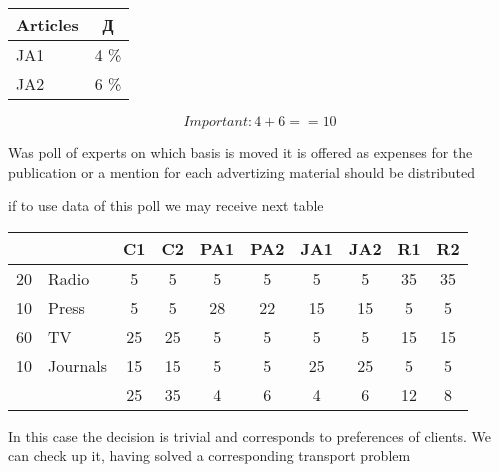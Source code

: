 \documentclass[a4paper,11pt]{scrartcl}
\begin{document}
\begin{tabular}{|l |c|}
\hline
 Articles & Д  \\

\hline
JA1  & 4  \%\\
\hline
JA2  & 6  \%\\
\hline

\end {tabular}
\begin{equation} Important:  4+6 == 10 \end{equation}

\bigskip

Was poll of experts on which basis is moved it is offered as expenses for the publication or a mention for each advertizing material should be distributed

if to use  data of this poll we may receive  next   table

\bigskip

\begin{tabular}{|l|l |c| c| c| c| c| c| c| c|}
\hline
&      &  C1 & C2  &  PA1 & PA2 & JA1 & JA2 & R1 & R2\\
\hline
20&Radio &  5 & 5  &  5 & 5 & 5 & 5 & 35 & 35\\
\hline
10&Press &  5 & 5  &  28 & 22 &  15 & 15 & 5 & 5\\
\hline
60&TV &  25 & 25  &  5 & 5 & 5 & 5 & 15 & 15\\
\hline
10&Journals &  15 & 15  &  5 & 5 & 25 & 25 & 5 & 5\\
\hline
 & & 25 &  35 & 4  &  6 & 4 & 6 & 12 & 8 \\
\hline
\end{tabular}


\bigskip


In this case the decision is trivial and corresponds 
to preferences of clients.
We can check up it, having solved a corresponding transport problem


\bigskip
\end{document}
